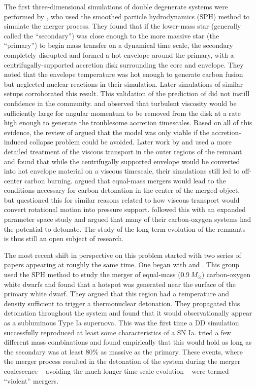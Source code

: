 \documentclass{emulateapj}
\begin{document}
The first three-dimensional simulations of double degenerate systems
were performed by \citet{benz:1990}, who used the smoothed particle
hydrodynamics (SPH) method to simulate the merger process. They found
that if the lower-mass star (generally called the ``secondary'') was
close enough to the more massive star (the ``primary'') to begin mass
transfer on a dynamical time scale, the secondary completely disrupted
and formed a hot envelope around the primary, with a
centrifugally-supported accretion disk surrounding the core and
envelope. They noted that the envelope temperature was hot enough to
generate carbon fusion but neglected nuclear reactions in their
simulation. Later simulations of similar setups
\citep{rasio_shapiro:1995,yoon:2007,loren-aguilar:2009,raskin:2012}
corroborated this result. This validation of the prediction of
\cite{tutukov_yungelson:1979} did not instill confidence in the
community. \cite{mochkovitch_livio:1990} and \cite{livio:2000}
observed that turbulent viscosity would be sufficiently large for
angular momentum to be removed from the disk at a rate high enough to
generate the troublesome accretion timescales. Based on all of this
evidence, the review of \cite{hillebrandtniemeyer2000} argued that the
model was only viable if the accretion-induced collapse problem could
be avoided. Later work by \cite{shen:2012} and \cite{schwab:2012} used
a more detailed treatment of the viscous transport in the outer
regions of the remnant and found that while the centrifugally
supported envelope would be converted into hot envelope material on a
viscous timescale, their simulations still led to off-center carbon
burning. \cite{vankerkwijk:2010} argued that equal-mass mergers would
lead to the conditions necessary for carbon detonation in the center
of the merged object, but \cite{shen:2012} questioned this for similar
reasons related to how viscous transport would convert rotational
motion into pressure support. \cite{zhu:2013} followed this with an
expanded parameter space study and argued that many of their
carbon-oxygen systems had the potential to detonate. The study of the
long-term evolution of the remnants is thus still an open subject of
research.

The most recent shift in perspective on this problem started with two
series of papers appearing at roughly the same time. One began with
\cite{pakmor:2010} and \cite{pakmor:2011}. This group used the SPH
method to study the merger of equal-mass ($0.9\ M_\odot$)
carbon-oxygen white dwarfs and found that a hotspot was generated near
the surface of the primary white dwarf. They argued that this region
had a temperature and density sufficient to trigger a thermonuclear
detonation. They propagated this detonation throughout the system and
found that it would observationally appear as a subluminous Type Ia
supernova. This was the first time a DD simulation successfully
reproduced at least some characteristics of a SN
Ia. \cite{pakmor:2011} tried a few different mass combinations and
found empirically that this would hold as long as the secondary was at
least 80\% as massive as the primary. These events, where the merger
process resulted in the detonation of the system during the merger
coalescence -- avoiding the much longer time-scale evolution -- were
termed ``violent'' mergers.
\end{document}
